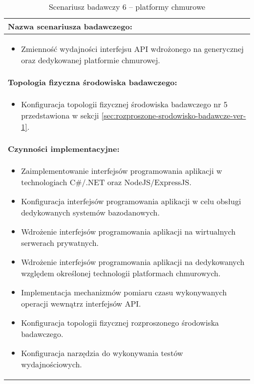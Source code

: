 \setlength{\LTcapwidth}{\textwidth}
\setlength\LTleft{0pt}
\setlength\LTright{0pt}
\begin{longtable}[c]{|llll|}
    \caption{Scenariusz badawczy 6 -- platformy chmurowe}
    \label{tab:research-scenario-6}                                                  \\ \hline
    \multicolumn{4}{|l|}{\textbf{Nazwa scenariusza badawczego:}}                     \\ \hline
    \multicolumn{4}{|p{\linewidth}|}{
        \begin{itemize}[label={}]
            \item Zmienność wydajności interfejsu API wdrożonego na generycznej oraz dedykowanej platformie chmurowej.
          \end{itemize}
    } \\ \hline
    \multicolumn{4}{|l|}{\textbf{Topologia fizyczna środowiska badawczego:}}         \\ \hline
    \multicolumn{4}{|p{\linewidth}|}{
        \begin{itemize}[label={}]
            \item Konfiguracja topologii fizycznej środowiska badawczego nr 5 przedstawiona w sekcji \ref{sec:rozproszone-srodowisko-badawcze-ver-1}.
          \end{itemize}
    }\\ \hline
    \multicolumn{4}{|l|}{\textbf{Czynności implementacyjne:}}                        \\ \hline
    \multicolumn{4}{|p{\linewidth}|}{
        \begin{itemize}
            \item Zaimplementowanie interfejsów programowania aplikacji w technologiach C\#/.NET oraz NodeJS/ExpressJS.
            \item Konfiguracja interfejsów programowania aplikacji w celu obsługi dedykowanych systemów bazodanowych.
            \item Wdrożenie interfejsów programowania aplikacji na wirtualnych serwerach prywatnych.
            \item Wdrożenie interfejsów programowania aplikacji na dedykowanych względem określonej technologii platformach chmurowych.
            \item Implementacja mechanizmów pomiaru czasu wykonywanych operacji wewnątrz interfejsów API.
            \item Konfiguracja topologii fizycznej rozproszonego środowiska badawczego.
            \item Konfiguracja narzędzia do wykonywania testów wydajnościowych.

\end{itemize}}
\end{longtable}
